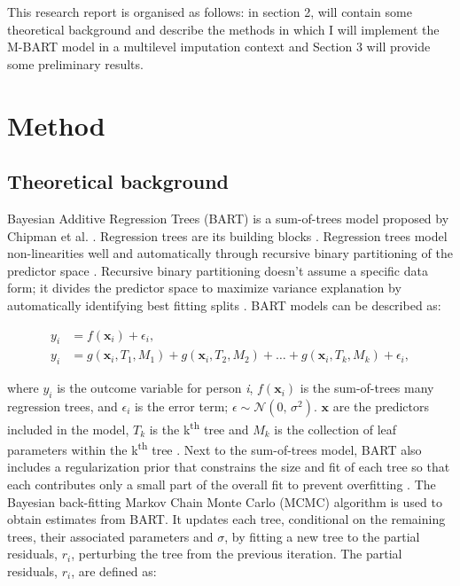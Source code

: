 \documentclass[10pt, a4paper, titlepage]{article}
\begin{document}
This research report is organised as follows: in section 2, will contain some theoretical background and describe the methods in which I will implement the M-BART model in a multilevel imputation context and Section 3 will provide some preliminary results.

\section{Method}

\subsection{Theoretical background}
Bayesian Additive Regression Trees (BART) is a sum-of-trees model proposed by Chipman et al. \citep{chipman2010}. Regression trees are its building blocks \citep{chipman2010, hill2020, james2021}. Regression trees model non-linearities well and automatically through recursive binary partitioning of the predictor space \citep{hill2020, burgette2010}. Recursive binary partitioning doesn't assume a specific data form; it divides the predictor space to maximize variance explanation by automatically identifying best fitting splits \citep{hastie2017, james2021, salditt2023}. BART models can be described as:

\begin{subequations}
\label{eq:BART}
\begin{align}
y_i &= f(\textbf{x}_i) + \epsilon_i, \tag{1.1} \\
y_i &= g(\textbf{x}_{i}, T_{1}, M_{1})+ g(\textbf{x}_{i}, T_{2}, M_{2}) + \dots + g(\textbf{x}_{i}, T_{k}, M_{k}) + \epsilon_i, \tag{1.2}
\end{align}
\end{subequations}

where $y_i$ is the outcome variable for person \textit{i}, $f(\textbf{x}_i)$ is the sum-of-trees many regression trees, and $\epsilon_i$ is the error term; $\epsilon \sim \mathcal{N}(0,\,\sigma^{2})$. $\textbf{x}$ are the predictors included in the model, $T_{k}$ is the k\textsuperscript{th} tree and $M_{k}$ is the collection of leaf parameters within the k\textsuperscript{th} tree \citep{chipman2010, hill2020, james2021}. Next to the sum-of-trees model, BART also includes a regularization prior that constrains the size and fit of each tree so that each contributes only a small part of the overall fit to prevent overfitting \citep{chipman2010, hill2020, james2021}. The Bayesian back-fitting Markov Chain Monte Carlo (MCMC) algorithm is used to obtain estimates from BART. It updates each tree, conditional on the remaining trees, their associated parameters and $\sigma$, by fitting a new tree to the partial residuals, $r_{i}$, perturbing the tree from the previous iteration. The partial residuals, $r_{i}$, are defined as:
\end{document}
